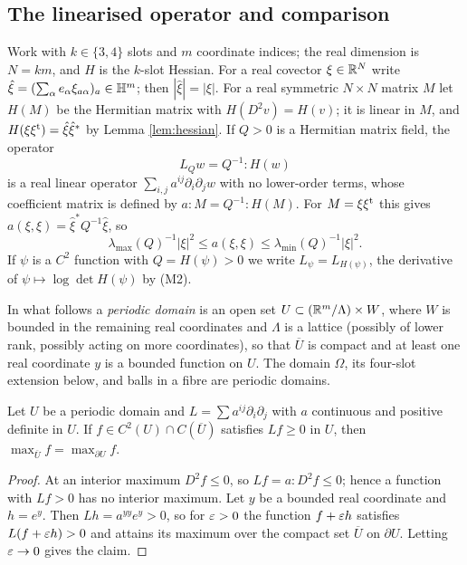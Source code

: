 \subsection{The linearised operator and comparison}
Work with $k\in\{3,4\}$ slots and $m$ coordinate indices; the real dimension is $N=km$, and $H$ is the
$k$-slot Hessian. For a real covector $\xi\in\mathbb{R}^N$ write $\hat\xi=(\sum_\alpha e_\alpha\xi_{a\alpha})_a\in\mathbb{H}^m$;
then $|\hat\xi|=|\xi|$. For a real symmetric $N\times N$ matrix $M$ let $H(M)$ be the Hermitian matrix with
$H(D^2v)=H(v)$; it is linear in $M$, and $H(\xi\xi^{\rm t})=\hat\xi\hat\xi^*$ by Lemma \ref{lem:hessian}. If
$Q>0$ is a Hermitian matrix field, the operator
\[
L_Qw=Q^{-1}:H(w)
\]
is a real linear operator $\sum_{i,j}a^{ij}\partial_i\partial_jw$ with no lower-order terms, whose coefficient
matrix is defined by $a:M=Q^{-1}:H(M)$. For $M=\xi\xi^{\rm t}$ this gives
$a(\xi,\xi)=\hat\xi^*Q^{-1}\hat\xi$, so
\begin{equation}\label{eq:ellipticity}
\lambda_{\max}(Q)^{-1}|\xi|^2\le a(\xi,\xi)\le\lambda_{\min}(Q)^{-1}|\xi|^2 .
\end{equation}
If $\psi$ is a $C^2$ function with $Q=H(\psi)>0$ we write $L_\psi=L_{H(\psi)}$, the derivative of
$\psi\mapsto\log\det H(\psi)$ by (M2).

In what follows a \emph{periodic domain} is an open set $U\subset(\mathbb{R}^{m}/\Lambda)\times W$, where $W$ is
bounded in the remaining real coordinates and $\Lambda$ is a lattice (possibly of lower rank, possibly
acting on more coordinates), so that $\overline U$ is compact and at least one real coordinate $y$ is
a bounded function on $U$. The domain $\Omega$, its four-slot extension below, and balls in a
fibre are periodic domains.

\begin{lemma}\label{lem:maxprinciple}
Let $U$ be a periodic domain and $L=\sum a^{ij}\partial_i\partial_j$ with $a$ continuous and positive
definite in $U$. If $f\in C^2(U)\cap C(\overline U)$ satisfies $Lf\ge0$ in $U$, then
$\max_{\overline U}f=\max_{\partial U}f$.
\end{lemma}

\begin{proof}
At an interior maximum $D^2f\le0$, so $Lf=a:D^2f\le0$; hence a function with $Lf>0$ has no interior
maximum. Let $y$ be a bounded real coordinate and $h=e^{y}$. Then $Lh=a^{yy}e^y>0$, so
for $\varepsilon>0$ the function $f+\varepsilon h$ satisfies $L(f+\varepsilon h)>0$ and attains its maximum over the
compact set $\overline U$ on $\partial U$. Letting $\varepsilon\to0$ gives the claim.
\end{proof}

